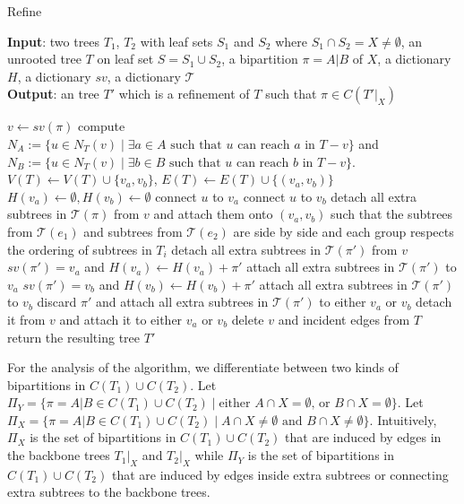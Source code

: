 \documentclass{article}
\begin{document}
\begin{algorithm}
    \caption{Refine}
    \label{alg:refine}
    \textbf{Input}: two trees $T_1$, $T_2$ with leaf sets $S_1$ and $S_2$ where $S_1 \cap S_2 = X \neq \emptyset$, an unrooted tree $T$ on leaf set $S = S_1 \cup S_2$, a bipartition $\pi = A|B$ of $X$, a dictionary $H$, a dictionary $sv$, a dictionary $\mathcal{T}$\\
    \textbf{Output}: an tree $T'$ which is a refinement of $T$ such that $\pi \in C(T'|_X)$ 
    \begin{algorithmic}[1]
        \State $v \gets sv(\pi)$
        \State compute $N_A:= \{u \in N_T(v) \mid \text{$\exists a \in A$ such that $u$ can reach $a$ in $T-v$}\}$ and $N_B:= \{u \in N_T(v) \mid \text{$\exists b \in B$ such that $u$ can reach $b$ in $T-v$}\}$.
        \State $V(T) \gets V(T) \cup \{v_a, v_b\}$, $E(T) \gets E(T) \cup \{(v_a,v_b)\}$
        \State $H(v_a) \gets \emptyset, H(v_b) \gets \emptyset$
             connect $u$ to $v_a$
            \Else{} connect $u$ to $v_b$
            \EndIf
        \EndFor
        \State detach all extra subtrees in $\mathcal{T}(\pi)$ from $v$ and attach them onto $(v_a,v_b)$ such that the subtrees from $\mathcal{T}(e_1)$ and subtrees from $\mathcal{T}(e_2)$ are side by side and each group respects the ordering of subtrees in $T_i$
            \State detach all extra subtrees in $\mathcal{T}(\pi')$ from $v$ 
                \State $sv(\pi') = v_a$ and $H(v_a) \gets H(v_a) + \pi'$
                \State attach all extra subtrees in $\mathcal{T}(\pi')$ to $v_a$
                \State $sv(\pi') = v_b$ and $H(v_b) \gets H(v_b) + \pi'$
                \State attach all extra subtrees in $\mathcal{T}(\pi')$ to $v_b$
            \Else{} 
                \State discard $\pi'$ and attach all extra subtrees in $\mathcal{T}(\pi')$ to either $v_a$ or $v_b$ 
            \EndIf
        \EndFor
            \State detach it from $v$ and attach it to either $v_a$ or $v_b$
        \EndFor
        \State delete $v$ and incident edges from $T$
        \State return the resulting tree $T'$
    \end{algorithmic}
\end{algorithm}

For the analysis of the algorithm, we differentiate between two kinds of bipartitions in $C(T_1) \cup C(T_2)$. Let $\Pi_Y = \{\pi = A|B \in C(T_1) \cup C(T_2) \mid \text{either } A\cap X = \emptyset \text{, or } B \cap X = \emptyset\}$. Let $\Pi_X = \{\pi = A|B \in C(T_1) \cup C(T_2) \mid A\cap X \neq \emptyset \text{ and } B\cap X \neq \emptyset \}$. Intuitively, $\Pi_X$ is the set of bipartitions in $C(T_1)\cup C(T_2)$ that are induced by edges in the backbone trees $T_1|_X$ and $T_2|_X$ while $\Pi_Y$ is the set of bipartitions in $C(T_1)\cup C(T_2)$ that are induced by edges inside extra subtrees or connecting extra subtrees to the backbone trees.\\
\end{document}
